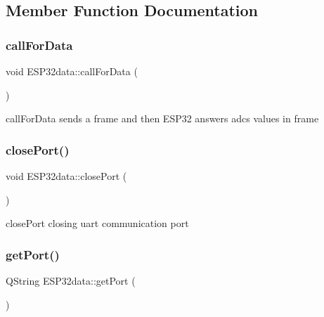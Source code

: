 \subsection{Member Function Documentation}
\mbox{\label{class_e_s_p32data_a50a3a6adc1a17b1d59e57c1ead7b369d}} 
\subsubsection{\texorpdfstring{call\+For\+Data}{callForData}}
{\footnotesize\ttfamily void E\+S\+P32data\+::call\+For\+Data (\begin{DoxyParamCaption}{ }\end{DoxyParamCaption})\hspace{0.3cm}{\ttfamily [slot]}}



call\+For\+Data sends a frame and then E\+S\+P32 answers adcs values in frame 

\mbox{\label{class_e_s_p32data_a74a82e4ce7f99e01b1c9e1f6e3cd6333}} 
\subsubsection{\texorpdfstring{close\+Port()}{closePort()}}
{\footnotesize\ttfamily void E\+S\+P32data\+::close\+Port (\begin{DoxyParamCaption}{ }\end{DoxyParamCaption})}



close\+Port closing uart communication port 

\mbox{\label{class_e_s_p32data_a7f451228e41241eb51347d6453f30590}} 
\subsubsection{\texorpdfstring{get\+Port()}{getPort()}}
{\footnotesize\ttfamily Q\+String E\+S\+P32data\+::get\+Port (\begin{DoxyParamCaption}{ }\end{DoxyParamCaption})}

